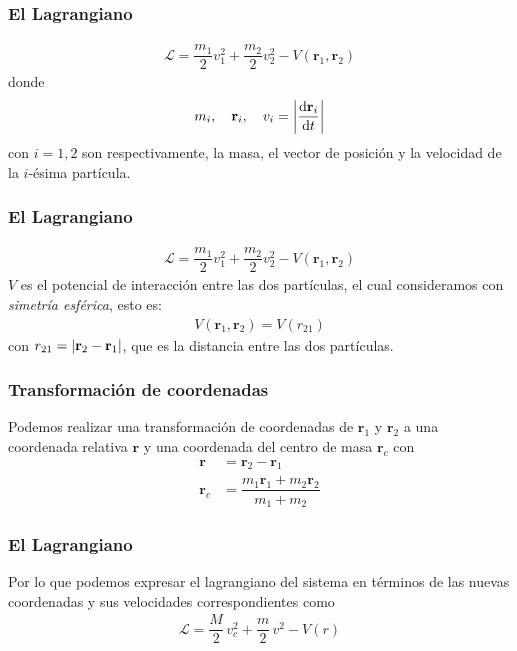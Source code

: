 \begin{frame}
\frametitle{El Lagrangiano}
\begin{align*}
\mathcal{L} = \dfrac{m_{1}}{2} v_{1}^{2} + \dfrac{m_{2}}{2} v_{2}^{2} - V(\mathbf{r}_{1}, \mathbf{r}_2)
\end{align*}
donde 
\begin{align*}
m_{i}, \quad \mathbf{r}_{i}, \quad v_{i} = \abs{\dv{\mathbf{r}_{i}}{t}}
\end{align*}
con $i = 1, 2$ son respectivamente, la masa, el vector de posición y la velocidad de la $i$-ésima partícula.
\end{frame}
\begin{frame}
\frametitle{El Lagrangiano}
\begin{align*}
\mathcal{L} = \dfrac{m_{1}}{2} v_{1}^{2} + \dfrac{m_{2}}{2} v_{2}^{2} - V(\mathbf{r}_{1}, \mathbf{r}_2)
\end{align*}
$V$ es el potencial de interacción entre las dos partículas, el cual consideramos con \emph{simetría esférica}, esto es:
\begin{align*}
V(\mathbf{r}_{1},\mathbf{r}_{2}) = V(r_{21})
\end{align*}
con $r_{21} = \abs{\mathbf{r}_{2} - \mathbf{r}_{1}}$, que es la distancia entre las dos partículas.
\end{frame}
\begin{frame}
\frametitle{Transformación de coordenadas}
Podemos realizar una transformación de coordenadas de $\mathbf{r}_{1}$ y $\mathbf{r}_{2}$ a una coordenada relativa $\mathbf{r}$ y una coordenada del centro de masa $\mathbf{r}_{c}$ con
\begin{align}
\mathbf{r} &= \mathbf{r}_{2} - \mathbf{r}_{1} \\[0.5em]
\mathbf{r}_{c} &= \dfrac{m_{1}\mathbf{r}_{1} + m_{2} \mathbf{r}_{2}}{m_{1} + m_{2}}
\end{align}
\end{frame}
\begin{frame}
\frametitle{El Lagrangiano}
Por lo que podemos expresar el lagrangiano del sistema en términos de las nuevas coordenadas y sus velocidades correspondientes como
\begin{align}
\mathcal{L} = \dfrac{M}{2} \, v_{c}^{2} + \dfrac{m}{2} \, v^{2} - V(r)
\end{align}
\end{frame}
